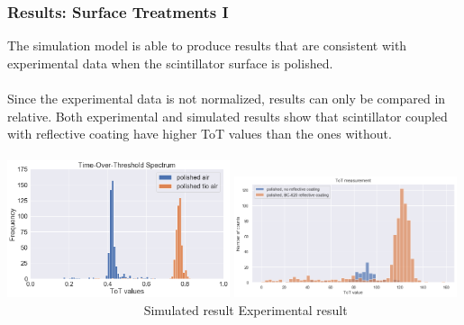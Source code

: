 \documentclass[xcolor=x11names, compress, handout]{beamer}
\renewcommand{\(}{\begin{columns}}
\renewcommand{\)}{\end{columns}}
\newcommand{\<}[1]{\begin{column}{#1}}
\renewcommand{\>}{\end{column}}
\begin{document}
\begin{frame}
\frametitle{Results: Surface Treatments I}
\scriptsize
The simulation model is able to produce results that are consistent with experimental data when the scintillator surface is polished. \\
\ \\
Since the experimental data is not normalized, results can only be compared in relative. Both experimental and simulated results show that scintillator coupled with reflective coating have higher ToT values than the ones without. \\
\ \\
\centering 
\includegraphics[width=0.49\textwidth, height=0.49\textheight]{images/comparison_polishedair_polishedtioair.png}
\includegraphics[width=0.49\textwidth, height=0.49\textheight]{images/roughness2.png}
\flushleft~~~~~~~~~~~~~~~~~~~~~ Simulated result \hspace{3cm} Experimental result
\end{frame}
\end{document}
